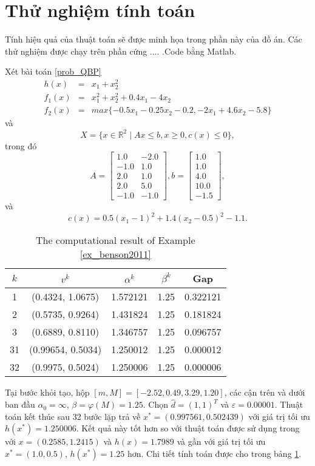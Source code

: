 \section{Thử nghiệm tính toán}

Tính hiệu quả của thuật toán sẽ được minh họa trong phần này của đồ án. Các thử nghiệm được chạy trên phần cứng ....  .Code bằng Matlab.
\begin{vd}\label{ex_benson2011}Xét bài toán \ref{prob_QBP}
\[
\begin{array}{ccl}
h(x) & = & x_{1}+x_{2}^{2}\\
f_{1}(x) & = & x_{1}^{2}+x_{2}^{2}+0.4x_{1}-4x_{2}\\
f_{2}(x) & = & max\{-0.5x_{1}-0.25x_{2}-0.2,-2x_{1}+4.6x_{2}-5.8\}
\end{array}
\]
và
\[
X=\{x\in\mathbb{R}^{2}\mid Ax\le b,x\ge0,c(x)\le0\},
\]
trong đó
\[
A=\left[\begin{array}{cc}
1.0 & -2.0\\
-1.0 & 1.0\\
2.0 & 1.0\\
2.0 & 5.0\\
-1.0 & -1.0
\end{array}\right],b=\left[\begin{array}{c}
1.0\\
1.0\\
4.0\\
10.0\\
-1.5
\end{array}\right],
\]
và
\[
c(x)=0.5(x_{1}-1)^{2}+1.4(x_{2}-0.5)^{2}-1.1.
\]

\end{vd}
\begin{table}

\caption{\label{tab:ex_benson2011}The computational result of Example \ref{ex_benson2011}}
\centering
\begin{tabular}{ccccc}
\hline 
$k$ & $v^{k}$ & $\alpha^{k}$ & $\beta^{k}$ & Gap\tabularnewline
\hline 
\hline 
1 & (0.4324, 1.0675) & 1.572121 & 1.25 & 0.322121\tabularnewline
\hline 
2 & (0.5735, 0.9264) & 1.431824 & 1.25 & 0.181824\tabularnewline
\hline 
3 & (0.6889, 0.8110) & 1.346757 & 1.25 & 0.096757\tabularnewline
\hline 
31 & (0.99654, 0.5034) & 1.250012 & 1.25 & 0.000012\tabularnewline
\hline 
32 & (0.9975, 0.5024) & 1.250006 & 1.25 & 0.000006 \tabularnewline
\hline 
\end{tabular}
\end{table}
Tại bước khỏi tạo, hộp $[m,M]=[-2.52,0.49,3.29,1.20]$,
các cận trên và dưới ban đầu $\alpha_{0}=\infty$, $\beta=\varphi(M)=1.25$. Chọn $\hat{d}=(1,1)^{T}$ và $\varepsilon=0.00001$.
Thuật toán kết thúc sau 32 bước lặp trả về $x^{*}=(0.997561, 0.502439)$ với giá trị tối ưu $h(x^{*})=1.250006$. Kết quả này tốt hơn so với thuật toán được sử dụng trong \cite{Benson2012} với $x=(0.2585,1.2415)$ và $h(x)=1.7989$ và gần với giá trị tối ưu $x^* = (1.0, 0.5)$, $h(x^*) = 1.25$ hơn. Chi tiết tính toán được cho trong bảng \ref{tab:ex_benson2011}.

